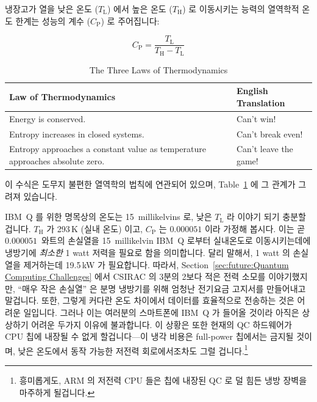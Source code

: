 \newcommand{\TLo}{T_\mathrm{L}}
\newcommand{\THi}{T_\mathrm{H}}
\newcommand{\CPf}{C_\mathrm{P}}

냉장고가 열을 낮은 온도 ($\TLo$) 에서 높은 온도 ($\THi$) 로 이동시키는 능력의
열역학적 온도 한계는 성능의 계수 ($\CPf$) 로 주어집니다:

\begin{equation}
	\CPf = \frac{\TLo}{\THi - \TLo}
\end{equation}

\begin{table}
\renewcommand*{\arraystretch}{1.25}
\centering\footnotesize
\begin{tabular}{p{1.7in}p{0.95in}}
\toprule
Law of Thermodynamics
	& English Translation \\
\midrule
Energy is conserved.
	& Can't win! \\
Entropy increases in closed systems.
	& Can't break even! \\
Entropy approaches a constant value as temperature approaches absolute zero.
	& Can't leave the game! \\
\bottomrule
\end{tabular}
\caption{The Three Laws of Thermodynamics}
\label{tab:future:The Three Laws of Thermodynamics}
\end{table}

이 수식은 도무지 불편한 열역학의 법칙에 연관되어 있으며,
Table~\ref{tab:future:The Three Laws of Thermodynamics} 에 그 관계가 그려져
있습니다.

IBM~Q 를 위한 명목상의 온도는 15~millikelvins 로, 낮은 $\TLo$ 라 이야기 되기
충분할 겁니다.
$\THi$ 가 293\,K (실내 온도) 이고, $\CPf$ 는 $0.000051$ 이라 가정해 봅시다.
이는 곧 $0.000051$~와트의 손실열을 15~millikelvin IBM~Q 로부터 실내온도로
이동시키는데에 냉방기에 \emph{최소한} 1 watt 저력을 필요로 함을 의미합니다.
달리 말해서, 1 watt 의 손실열을 제거하는데 19.5\,kW 가 필요합니다.
따라서,
Section~\ref{sec:future:Quantum Computing Challenges} 에서 CSIRAC 의 3분의
2보다 적은 전력 소모를 이야기했지만, ``매우 작은 손실열'' 은 분명 냉방기를 위해
엄청난 전기요금 고지서를 만들어내고 말겁니다.
또한, 그렇게 커다란 온도 차이에서 데이터를 효율적으로 전송하는 것은 어려운
일입니다.
그러나 이는 여러분의 스마트폰에 IBM~Q 가 들어올 것이라 아직은 상상하기 어려운
두가지 이유에 불과합니다.
이 상황은 또한 현재의 QC 하드웨어가 CPU 칩에 내장될 수 없게 할겁니다---이 냉각
비용은 full-power 칩에서는 금지될 것이며, 낮은 온도에서 동작 가능한 저전력
회로에서조차도 그럴 겁니다.\footnote{
	흥미롭게도, ARM 의 저전력 CPU 들은 칩에 내장된 QC 로 덜 힘든 냉방
	장벽을 마주하게 될겁니다.}
\iffalse

